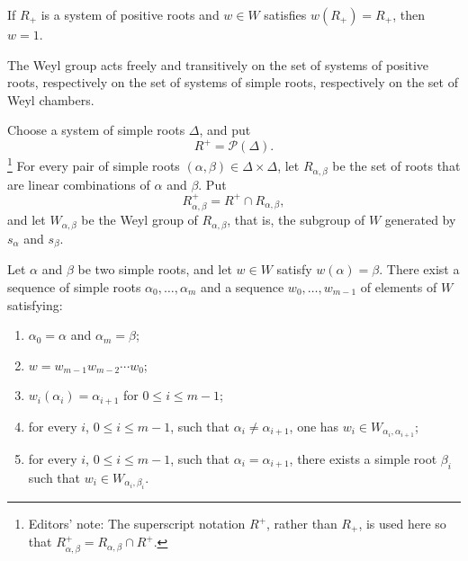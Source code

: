 \begin{corollary}\label{sga3:XXI:5.4}
If \(R_+\) is a system of positive roots and \(w\in W\) satisfies
\(w(R_+)=R_+\), then \(w=1\).
\end{corollary}

\begin{corollary}\label{sga3:XXI:5.5}
The Weyl group acts freely and transitively on the set of systems of
positive roots, respectively on the set of systems of simple roots,
respectively on the set of Weyl chambers.
\end{corollary}

Choose a system of simple roots \(\Delta\), and put
\[
 R^+=\mathscr{P}(\Delta).
\]
\footnote{Editors' note: The superscript notation \(R^+\), rather
than \(R_+\), is used here so that
\(R^+_{\alpha,\beta}=R_{\alpha,\beta}\cap R^+\).}
For every pair of simple roots
\((\alpha,\beta)\in\Delta\times\Delta\), let
\(R_{\alpha,\beta}\) be the set of roots that are linear combinations
of \(\alpha\) and \(\beta\). Put
\[
 R^+_{\alpha,\beta}=R^+\cap R_{\alpha,\beta},
\]
and let \(W_{\alpha,\beta}\) be the Weyl group of
\(R_{\alpha,\beta}\), that is, the subgroup of \(W\) generated by
\(s_\alpha\) and \(s_\beta\).

\begin{theorem}[Tits]\label{sga3:XXI:5.6}
Let \(\alpha\) and \(\beta\) be two simple roots, and let \(w\in W\)
satisfy \(w(\alpha)=\beta\). There exist a sequence of simple roots
\(\alpha_0,\ldots,\alpha_m\) and a sequence
\(w_0,\ldots,w_{m-1}\) of elements of \(W\) satisfying:
\begin{enumerate}
\item[(i)] \(\alpha_0=\alpha\) and \(\alpha_m=\beta\);
\item[(ii)] \(w=w_{m-1}w_{m-2}\cdots w_0\);
\item[(iii)] \(w_i(\alpha_i)=\alpha_{i+1}\) for
  \(0\le i\le m-1\);
\item[(iv)] for every \(i\), \(0\le i\le m-1\), such that
  \(\alpha_i\ne\alpha_{i+1}\), one has
  \(w_i\in W_{\alpha_i,\alpha_{i+1}}\);
\item[(v)] for every \(i\), \(0\le i\le m-1\), such that
  \(\alpha_i=\alpha_{i+1}\), there exists a simple root \(\beta_i\)
  such that \(w_i\in W_{\alpha_i,\beta_i}\).
\end{enumerate}
\end{theorem}


